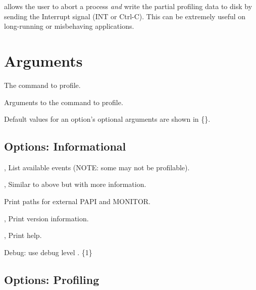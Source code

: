 \documentclass[english]{article}
\begin{document}
 allows the user to abort a process \emph{and} write the partial profiling data to disk by sending the Interrupt signal (INT or Ctrl-C).  This can be extremely useful on long-running or misbehaving applications.

\section{Arguments}

\begin{Description}
\item[\Arg{command}] The command to profile.
\item[\Arg{command-arguments}] Arguments to the command to profile.
\end{Description}

Default values for an option's optional arguments are shown in \{\}.

\subsection{Options: Informational}

\begin{Description}
\item[\Opt{-l}, \Opt{--events-short}] List available events (NOTE: some may not be profilable).
\item[\Opt{-L}, \Opt{--events-long}] Similar to above but with more information.
\item[\Opt{--paths}] Print paths for external PAPI and MONITOR.
\item[\Opt{-V}, \Opt{--version}] Print version information.
\item[\Opt{-h}, \Opt{--help}] Print help.
\item[\OptoArg{--debug}{n}]   Debug: use debug level . \{1\}
\end{Description}

\subsection{Options: Profiling}
\end{document}
